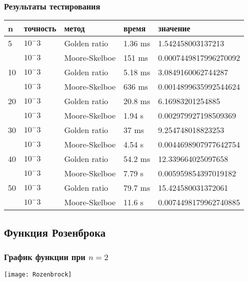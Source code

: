     \subsubsection*{Результаты тестирования}

    \begin{tabular}{ |p{2cm}|p{2cm}|p{3cm}|p{2cm}|p{4cm}|  }
        \hline
        n  & точность & метод         & время   & значение              \\
        \hline
        5  & $10^-3$  & Golden ratio  & 1.36 ms & 1.542458003137213     \\\cline{2-5}
        & $10^-3$  & Moore-Skelboe & 151 ms  & 0.0007449817996270092 \\
        \hline
        10 & $10^-3$  & Golden ratio  & 5.18 ms & 3.0849160062744287    \\\cline{2-5}
        & $10^-3$  & Moore-Skelboe & 636 ms  & 0.0014899635992544624 \\
        \hline
        20 & $10^-3$  & Golden ratio  & 20.8 ms & 6.16983201254885      \\\cline{2-5}
        & $10^-3$  & Moore-Skelboe & 1.94 s  & 0.002979927198509369  \\
        \hline
        30 & $10^-3$  & Golden ratio  & 37 ms   & 9.254748018823253     \\\cline{2-5}
        & $10^-3$  & Moore-Skelboe & 4.54 s  & 0.0044698907977642754 \\
        \hline
        40 & $10^-3$  & Golden ratio  & 54.2 ms & 12.339664025097658    \\\cline{2-5}
        & $10^-3$  & Moore-Skelboe & 7.79 s  & 0.005959854397019182  \\
        \hline
        50 & $10^-3$  & Golden ratio  & 79.7 ms & 15.424580031372061    \\\cline{2-5}
        & $10^-3$  & Moore-Skelboe & 11.6 s  & 0.0074498179962740885 \\
        \hline

    \end{tabular}

    \subsection*{Функция Розенброка}

    \subsubsection*{График функции при $n=2$}
    \texttt{[image: Rozenbrock]}

